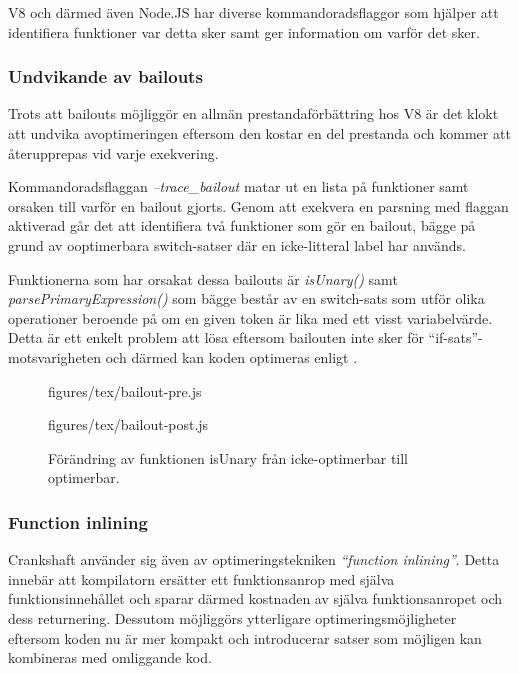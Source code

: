 V8 och därmed även Node.JS har diverse kommandoradsflaggor som hjälper att
identifiera funktioner var detta sker samt ger information om varför det sker.

\subsubsection{Undvikande av bailouts}

Trots att bailouts möjliggör en allmän prestandaförbättring hos
V8 är det klokt att undvika avoptimeringen eftersom den kostar en del
prestanda och kommer att återupprepas vid varje exekvering.

Kommandoradsflaggan \textit{--trace_bailout} matar ut en lista på funktioner
samt orsaken till varför en bailout gjorts. Genom att exekvera en parsning med
flaggan aktiverad går det att identifiera två funktioner som gör en bailout,
bägge på grund av ooptimerbara switch-satser där en icke-litteral label har
används.

Funktionerna som har orsakat dessa bailouts är \textit{isUnary()} samt
\textit{parsePrimaryExpression()} som bägge består av en switch-sats som utför
olika operationer beroende på om en given token är lika med ett visst
variabelvärde.  Detta är ett enkelt problem att lösa eftersom bailouten inte
sker för ``if-sats''-motsvarigheten och därmed kan koden optimeras enligt
.

\begin{figure}[ht]
  \begin{minipage}[t]{0.5\textwidth}
      {figures/tex/bailout-pre.js}
  \end{minipage}%
  \begin{minipage}[t]{0.5\textwidth}
      {figures/tex/bailout-post.js}
  \end{minipage}
  \caption{Förändring av funktionen isUnary från icke-optimerbar till
  optimerbar.}
  \label{fig:bailout}
\end{figure}

\subsubsection{Function inlining}

Crankshaft använder sig även av optimeringstekniken
\textit{``function inlining''}. Detta innebär att kompilatorn ersätter ett
funktionsanrop med själva funktionsinnehållet och sparar därmed kostnaden av
själva funktionsanropet och dess returnering. Dessutom möjliggörs ytterligare
optimeringsmöjligheter eftersom koden nu är mer kompakt och introducerar
satser som möjligen kan kombineras med omliggande kod.

